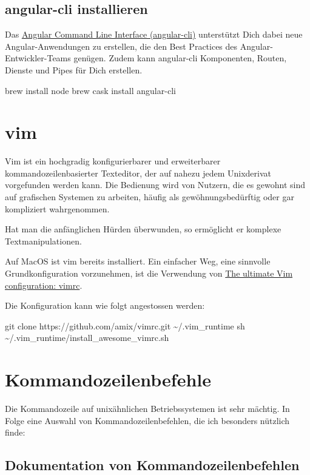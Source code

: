 \documentclass[]{article}
\begin{document}
\subsection{angular-cli installieren}
Das \href{https://cli.angular.io/}{Angular Command Line Interface (angular-cli)} unterstützt Dich dabei neue Angular-Anwendungen zu erstellen, die den Best Practices des Angular-Entwickler-Teams genügen. Zudem kann angular-cli Komponenten, Routen, Dienste und Pipes für Dich erstellen.

\begin{bashcode}
brew install node
brew cask install angular-cli
\end{bashcode}

\section{vim}
Vim ist ein hochgradig konfigurierbarer und erweiterbarer kommandozeilenbasierter Texteditor, der auf nahezu jedem Unixderivat vorgefunden werden kann. Die Bedienung wird von Nutzern, die es gewohnt sind auf grafischen Systemen zu arbeiten, häufig als gewöhnungsbedürftig oder gar kompliziert wahrgenommen. 

Hat man die anfänglichen Hürden überwunden, so  ermöglicht er komplexe Textmanipulationen.

Auf MacOS ist vim bereits installiert. Ein einfacher Weg, eine sinnvolle Grundkonfiguration vorzunehmen, ist die Verwendung von \href{https://github.com/amix/vimrc}{The ultimate Vim configuration: vimrc}.

Die Konfiguration kann wie folgt angestossen werden:

\begin{bashcode}
git clone https://github.com/amix/vimrc.git \~{}/.vim\_runtime
sh \~{}/.vim\_runtime/install\_awesome\_vimrc.sh
\end{bashcode}

\section{Kommandozeilenbefehle}
Die Kommandozeile auf unixähnlichen Betriebssystemen ist sehr mächtig. 
In Folge eine Auswahl von Kommandozeilenbefehlen, die ich besonders nützlich finde:

\subsection{Dokumentation von Kommandozeilenbefehlen}
\end{document}
